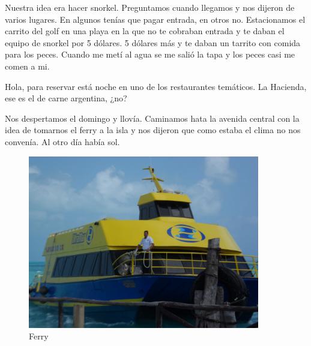 \documentclass[12pt,twoside,openright,a5paper]{book}
\begin{document}
Nuestra idea era hacer snorkel. Preguntamos cuando llegamos y nos
dijeron de varios lugares. En algunos tenías que pagar entrada, en otros
no. Estacionamos el carrito del golf en una playa en la que no te cobraban
entrada y te daban el equipo de snorkel por 5 dólares. 5 dólares más y
te daban un tarrito con comida para los peces. Cuando me metí al agua
se me salió la tapa y los peces casi me comen a mi.


\vspace{0.5cm}
\hrulefill\hspace{0.2cm} \decofourleft\decofourright \hspace{0.2cm} \hrulefill
\vspace{0.5cm}

Hola, para reservar está noche en uno de los restaurantes temáticos. La
Hacienda, ese es el de carne argentina, ¿no?


\vspace{0.5cm}
\hrulefill\hspace{0.2cm} \decofourleft\decofourright \hspace{0.2cm} \hrulefill
\vspace{0.5cm}

Nos despertamos el domingo y llovía. Caminamos hata la avenida central
con la idea de tomarnos el ferry a la isla y nos dijeron que como estaba
el clima no nos convenía. Al otro día había sol.

\begin{figure}[H]
  \centering
    \includegraphics[width=0.9\textwidth]{fotos/2012/ferry}
  \caption{Ferry} \label{Ferry}
\end{figure}


\vspace{0.5cm}
\hrulefill\hspace{0.2cm} \decofourleft\decofourright \hspace{0.2cm} \hrulefill
\vspace{0.5cm}
\end{document}
